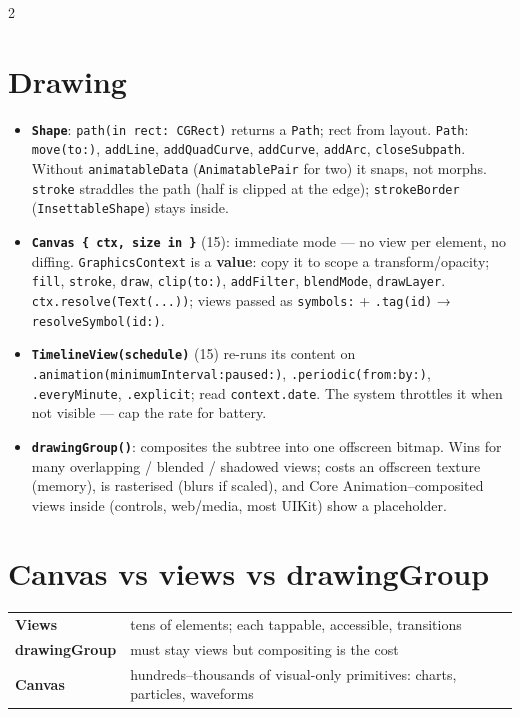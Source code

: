 \documentclass[8pt]{extarticle}
\begin{document}
\begin{multicols}{2}
\section{Drawing}
\begin{itemize}
  \item \textbf{\texttt{Shape}}: \texttt{path(in rect: CGRect)} returns a \texttt{Path}; rect from layout.
        \texttt{Path}: \texttt{move(to:)}, \texttt{addLine}, \texttt{addQuadCurve}, \texttt{addCurve}, \texttt{addArc},
        \texttt{closeSubpath}. Without \texttt{animatableData} (\texttt{AnimatablePair} for two) it snaps, not morphs.
        \texttt{stroke} straddles the path (half is clipped at the edge); \texttt{strokeBorder}
        (\texttt{InsettableShape}) stays inside.
  \item \textbf{\texttt{Canvas \{ ctx, size in \}}} (15): immediate mode — no view per element, no diffing.
        \texttt{GraphicsContext} is a \textbf{value}: copy it to scope a transform/opacity; \texttt{fill}, \texttt{stroke},
        \texttt{draw}, \texttt{clip(to:)}, \texttt{addFilter}, \texttt{blendMode}, \texttt{drawLayer}.
        \texttt{ctx.resolve(Text(...))}; views passed as \texttt{symbols:} + \texttt{.tag(id)} → \texttt{resolveSymbol(id:)}.
  \item \textbf{\texttt{TimelineView(schedule)}} (15) re-runs its content on \texttt{.animation(minimumInterval:paused:)},
        \texttt{.periodic(from:by:)}, \texttt{.everyMinute}, \texttt{.explicit}; read \texttt{context.date}. The system
        throttles it when not visible — cap the rate for battery.
  \item \textbf{\texttt{drawingGroup()}}: composites the subtree into one offscreen bitmap. Wins for many
        overlapping / blended / shadowed views; costs an offscreen texture (memory), is rasterised (blurs if scaled),
        and Core Animation–composited views inside (controls, web/media, most UIKit) show a placeholder.
\end{itemize}

\section{Canvas vs views vs drawingGroup}
{\footnotesize
\begin{tabular}{@{}>{\raggedright\arraybackslash}p{17mm}>{\raggedright\arraybackslash}p{55mm}@{}}
\toprule
\textbf{Views} & tens of elements; each tappable, accessible, transitions \\
\textbf{drawingGroup} & must stay views but compositing is the cost \\
\textbf{Canvas} & hundreds–thousands of visual-only primitives: charts, particles, waveforms \\
\bottomrule
\end{tabular}}


\end{multicols}
\end{document}

